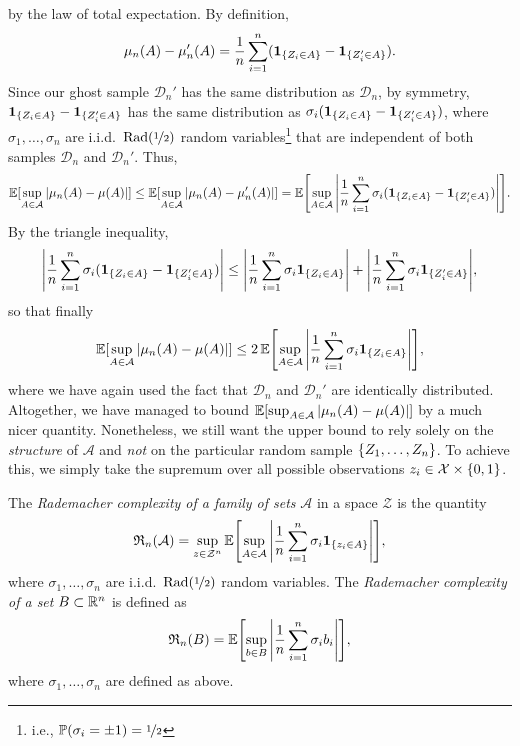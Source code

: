 by the law of total expectation. By definition,
\[
    \mu_n(A) - \mu_n'(A) = \frac{1}{n} \sum_{i=1}^n (\indSet{Z_i \in A} - \ind{\{Z_i' \in A\}}).
\]
Since our ghost sample $\mathcal{D}_n'$ has the same distribution as $\mathcal{D}_n$, by symmetry, $\indSet{Z_i \in A} - \ind{\{Z_i' \in A\}}$ has the same distribution as $\sigma_i (\indSet{Z_i \in A} - \ind{\{Z_i' \in A\}})$, where $\sigma_1, \dots, \sigma_n$ are i.i.d.\ $\operatorname{Rad}(\nicefrac{1}{2})$ random variables\footnote{i.e., $\operatorname{\mathbb{P}}(\sigma_i = \pm 1) = \nicefrac{1}{2}$} that are independent of both samples $\mathcal{D}_n$ and $\mathcal{D}_n'$. Thus,
\[
    \Exp[\sup_{A \in \mathcal{A}} \abs{\mu_n(A) - \mu(A)}] \leq \Exp[\sup_{A \in \mathcal{A}} \abs*{\mu_n(A) - \mu_n'(A)}] = \Exp\left[\sup_{A \in \mathcal{A}} \abs{\frac{1}{n} \sum_{i=1}^n \sigma_i (\indSet{Z_i \in A} - \ind{\{Z_i' \in A\}})}\right].
\]
By the triangle inequality,
\[
    \abs{\frac{1}{n} \sum_{i=1}^n \sigma_i (\indSet{Z_i \in A} - \ind{\{Z_i' \in A\}}) } \leq \abs{\frac{1}{n} \sum_{i=1}^n \sigma_i \indSet{Z_i \in A}} + \abs{\frac{1}{n} \sum_{i=1}^n \sigma_i \ind{\{Z_i' \in A\}}},
\]
so that finally
\begin{equation}
\label{eq: precursor to symmetrization bound}
    \Exp[\sup_{A \in \mathcal{A}} \abs{\mu_n(A) - \mu(A)}] \leq 2 \Exp\left[\sup_{A \in \mathcal{A}} \abs{\frac{1}{n} \sum_{i=1}^n \sigma_i \indSet{Z_i \in A}}\right],
\end{equation}
where we have again used the fact that $\mathcal{D}_n$ and $\mathcal{D}_n'$ are identically distributed. Altogether, we have managed to bound $\operatorname{\mathbb{E}}[\sup_{A \in \mathcal{A}} \abs{\mu_n(A) - \mu(A)}]$ by a much nicer quantity. Nonetheless, we still want the upper bound to rely solely on the \emph{structure} of $\mathcal{A}$ and \emph{not} on the particular random sample $\set{Z_1, \dots, Z_n}$. To achieve this, we simply take the supremum over all possible observations $z_i \in \mathcal{X} \times \set{0, 1}$.

\begin{definition}
The \emph{Rademacher complexity of a family of sets} $\mathcal{A}$ in a space $\mathcal{Z}$ is the quantity
\[
    \mathfrak{R}_n(\mathcal{A}) = \sup_{z \in \mathcal{Z}^n} \Exp\left[\sup_{A \in \mathcal{A}} \abs{\frac{1}{n} \sum_{i=1}^n \sigma_i \indSet{z_i \in A}}\right],
\]
where $\sigma_1, \dots, \sigma_n$ are i.i.d.\ $\operatorname{Rad}(\nicefrac{1}{2})$ random variables. The \emph{Rademacher complexity of a set} $B \subset \mathbb{R}^n$ is defined as 
\[
    \mathfrak{R}_n(B) = \Exp\left[\sup_{b \in B} \abs{\frac{1}{n} \sum_{i=1}^n \sigma_i b_i}\right],
\]
where $\sigma_1, \dots, \sigma_n$ are defined as above.
\end{definition}

